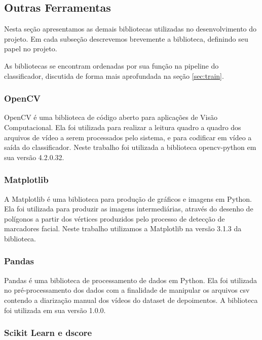 \subsection{Outras Ferramentas}
\label{subsec:otools}

Nesta seção apresentamos as demais bibliotecas utilizadas no desenvolvimento do projeto. Em cada subseção descrevemos brevemente a biblioteca, definindo seu papel no projeto.

As bibliotecas se encontram ordenadas por sua função na pipeline do classificador, discutida de forma mais aprofundada na seção \ref{sec:train}.

\subsubsection{OpenCV}

OpenCV\cite{opencv_library} é uma biblioteca de código aberto para aplicações de Visão Computacional.
Ela foi utilizada para realizar a leitura quadro a quadro dos arquivos de vídeo a serem processados pelo sistema, e para codificar em vídeo a saída do classificador.
Neste trabalho foi utilizada a biblioteca opencv-python em sua versão 4.2.0.32.

\subsubsection{Matplotlib}

A Matplotlib\cite{hunterMatplotlib2DGraphics2007} é uma biblioteca para produção de gráficos e imagens em Python.
Ela foi utilizada para produzir as imagens intermediárias, através do desenho de polígonos a partir dos vértices produzidos pelo processo de detecção de marcadores facial.
Neste trabalho utilizamos a Matplotlib na versão 3.1.3 da biblioteca.

\subsubsection{Pandas}

Pandas\cite{mckinney-proc-scipy-2010} é uma biblioteca de processamento de dados em Python.
Ela foi utilizada no pré-processamento dos dados com a finalidade de manipular os arquivos csv contendo a diarização manual dos vídeos do dataset de depoimentos.
A biblioteca foi utilizada em sua versão 1.0.0.

\subsubsection{Scikit Learn e dscore}

